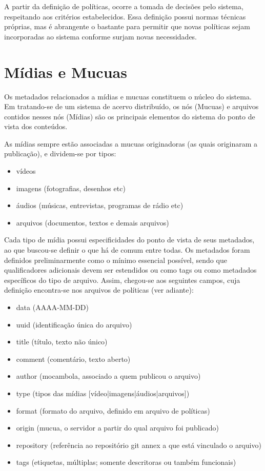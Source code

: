 A partir da definição de políticas, ocorre a tomada de decisões pelo
sistema, respeitando aos critérios estabelecidos. Essa definição
possui normas técnicas próprias, mas é abrangente o bastante para
permitir que novas políticas sejam incorporadas ao sistema conforme
surjam novas necessidades.

\section{Mídias e Mucuas}

Os metadados relacionados a mídias e mucuas constituem o núcleo do
sistema. Em tratando-se de um sistema de acervo distribuído, os nós
(Mucuas) e arquivos contidos nesses nós (Mídias) são os principais
elementos do sistema do ponto de vista dos conteúdos.

As mídias sempre estão associadas a mucuas originadoras (as quais originaram a publicação), e dividem-se por tipos:
\begin{itemize}
\item vídeos
\item imagens (fotografias, desenhos etc)
\item áudios (músicas, entrevistas, programas de rádio etc)
\item arquivos (documentos, textos e demais arquivos)
\end{itemize}

Cada tipo de mídia possui especificidades do ponto de vista de seus
metadados, ao que buscou-se definir o que há de comum entre todas. Os
metadados foram definidos preliminarmente como o mínimo essencial
possível, sendo que qualificadores adicionais devem ser estendidos ou
como tags ou como metadados específicos do tipo de arquivo. Assim,
chegou-se aos seguintes campos, cuja definição encontra-se nos
arquivos de políticas (ver adiante):
\begin{itemize}
\item data (AAAA-MM-DD)
\item uuid (identificação única do arquivo)
\item title (título, texto não único)
\item comment (comentário, texto aberto)
\item author (mocambola, associado a quem publicou o arquivo)
\item type (tipos das mídias [vídeo|imagens|áudios|arquivos])
\item format (formato do arquivo, definido em arquivo de políticas)
\item origin (mucua, o servidor a partir do qual arquivo foi
  publicado)
\item repository (referência ao repositório git annex a que está vinculado o arquivo)
\item tags (etiquetas, múltiplas; somente descritoras ou também
  funcionais)
\end{itemize}

